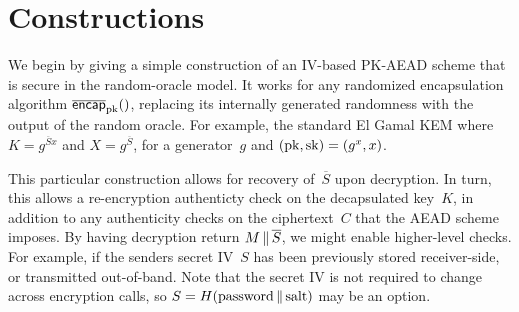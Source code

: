 \section{Constructions}
\label{sec:constructions}
We begin by giving a simple construction of an IV-based PK-AEAD scheme that is secure in the random-oracle model. It works for any randomized encapsulation algorithm $\OLencapprim{\pk}{}$, replacing its internally generated randomness with the output of the random oracle.  For example, the standard El Gamal KEM where $K=g^{\overline{S}x}$ and $X=g^{\overline{S}}$, for a generator~$g$ and $(\mathrm{pk},\mathrm{sk})=(g^x,x)$.

This particular construction allows for recovery of~$\overline{S}$ upon decryption.  In turn, this allows a re-encryption authenticty check on the decapsulated key~$K$, in addition to any authenticity checks on the ciphertext~$C$ that the AEAD scheme imposes.      By having decryption return $M \,\|\, \overline{S}$, we might enable higher-level checks.  For example, if the senders secret IV~$S$ has been previously stored receiver-side, or transmitted out-of-band.  Note that the secret IV is not required to change across encryption calls, so $S=H(\mbox{password}\,\|\,\mbox{salt})$ may be an option. 


